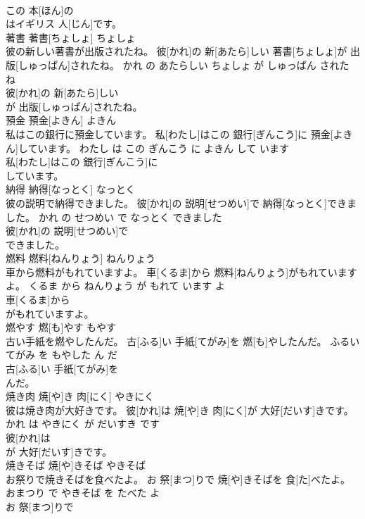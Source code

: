 \documentclass[8pt]{extreport}
\begin{document}
\begin{CJK}{UTF8}{min}
\\	この 本[ほん]の
\\	はイギリス 人[じん]です。			
\\	著書	著書[ちょしょ]	ちょしょ	
\\	彼の新しい著書が出版されたね。	彼[かれ]の 新[あたら]しい 著書[ちょしょ]が 出版[しゅっぱん]されたね。	かれ の あたらしい ちょしょ が しゅっぱん された ね	
\\	彼[かれ]の 新[あたら]しい
\\	が 出版[しゅっぱん]されたね。			
\\	預金	預金[よきん]	よきん	
\\	私はこの銀行に預金しています。	私[わたし]はこの 銀行[ぎんこう]に 預金[よきん]しています。	わたし は この ぎんこう に よきん して います	
\\	私[わたし]はこの 銀行[ぎんこう]に
\\	しています。			
\\	納得	納得[なっとく]	なっとく	
\\	彼の説明で納得できました。	彼[かれ]の 説明[せつめい]で 納得[なっとく]できました。	かれ の せつめい で なっとく できました	
\\	彼[かれ]の 説明[せつめい]で
\\	できました。			
\\	燃料	燃料[ねんりょう]	ねんりょう	
\\	車から燃料がもれていますよ。	車[くるま]から 燃料[ねんりょう]がもれていますよ。	くるま から ねんりょう が もれて います よ	
\\	車[くるま]から
\\	がもれていますよ。			
\\	燃やす	燃[も]やす	もやす	
\\	古い手紙を燃やしたんだ。	古[ふる]い 手紙[てがみ]を 燃[も]やしたんだ。	ふるい てがみ を もやした ん だ	
\\	古[ふる]い 手紙[てがみ]を
\\	んだ。			
\\	焼き肉	焼[や]き 肉[にく]	やきにく	
\\	彼は焼き肉が大好きです。	彼[かれ]は 焼[や]き 肉[にく]が 大好[だいす]きです。	かれ は やきにく が だいすき です	
\\	彼[かれ]は
\\	が 大好[だいす]きです。			
\\	焼きそば	焼[や]きそば	やきそば	
\\	お祭りで焼きそばを食べたよ。	お 祭[まつ]りで 焼[や]きそばを 食[た]べたよ。	おまつり で やきそば を たべた よ	
\\	お 祭[まつ]りで

\end{CJK}
\end{document}

